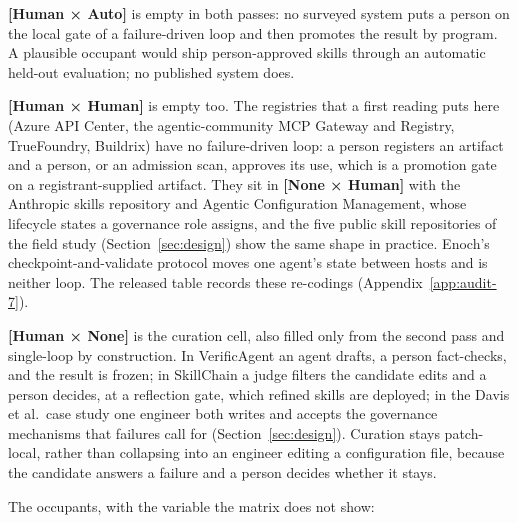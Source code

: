 \documentclass[
  11pt,
]{article}
\begin{document}
\textbf{{[}Human × Auto{]}} is empty in both passes: no surveyed system puts a person on the local gate of a failure-driven loop and then promotes the result by program. A plausible occupant would ship person-approved skills through an automatic held-out evaluation; no published system does.

\textbf{{[}Human × Human{]}} is empty too. The registries that a first reading puts here (Azure API Center, the agentic-community MCP Gateway and Registry, TrueFoundry, Buildrix) have no failure-driven loop: a person registers an artifact and a person, or an admission scan, approves its use, which is a promotion gate on a registrant-supplied artifact. They sit in \textbf{{[}None × Human{]}} with the Anthropic skills repository and Agentic Configuration Management, whose lifecycle states a governance role assigns, and the five public skill repositories of the field study (Section~\ref{sec:design}) show the same shape in practice. Enoch's checkpoint-and-validate protocol moves one agent's state between hosts and is neither loop. The released table records these re-codings (Appendix~\ref{app:audit-7}).

\textbf{{[}Human × None{]}} is the curation cell, also filled only from the second pass and single-loop by construction. In VerificAgent an agent drafts, a person fact-checks, and the result is frozen; in SkillChain a judge filters the candidate edits and a person decides, at a reflection gate, which refined skills are deployed; in the Davis et al.~case study one engineer both writes and accepts the governance mechanisms that failures call for (Section~\ref{sec:design}). Curation stays patch-local, rather than collapsing into an engineer editing a configuration file, because the candidate answers a failure and a person decides whether it stays.

The occupants, with the variable the matrix does not show:
\end{document}
